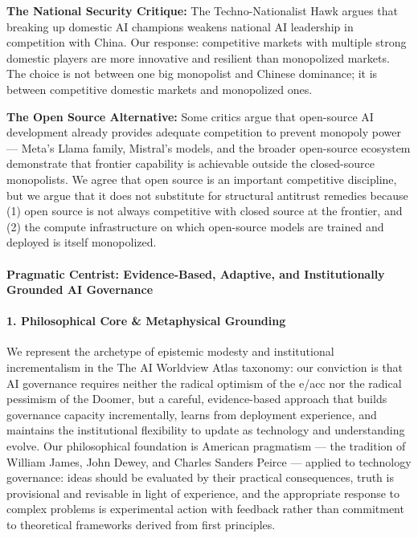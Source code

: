 \textbf{The National Security Critique:} The Techno-Nationalist Hawk
argues that breaking up domestic AI champions weakens national AI
leadership in competition with China. Our response: competitive markets
with multiple strong domestic players are more innovative and resilient
than monopolized markets. The choice is not between one big monopolist
and Chinese dominance; it is between competitive domestic markets and
monopolized ones.

\textbf{The Open Source Alternative:} Some critics argue that
open-source AI development already provides adequate competition to
prevent monopoly power --- Meta's Llama family, Mistral's models, and
the broader open-source ecosystem demonstrate that frontier capability
is achievable outside the closed-source monopolists. We agree that open
source is an important competitive discipline, but we argue that it does
not substitute for structural antitrust remedies because (1) open source
is not always competitive with closed source at the frontier, and (2)
the compute infrastructure on which open-source models are trained and
deployed is itself monopolized.

\paragraph{Pragmatic Centrist: Evidence-Based, Adaptive, and
Institutionally Grounded AI
Governance}\label{pragmatic-centrist-evidence-based-adaptive-and-institutionally-grounded-ai-governance}

\paragraph{1. Philosophical Core \& Metaphysical
Grounding}\label{philosophical-core-metaphysical-grounding-29}

We represent the archetype of epistemic modesty and institutional
incrementalism in the The AI Worldview Atlas taxonomy: our conviction is
that AI governance requires neither the radical optimism of the e/acc
nor the radical pessimism of the Doomer, but a careful, evidence-based
approach that builds governance capacity incrementally, learns from
deployment experience, and maintains the institutional flexibility to
update as technology and understanding evolve. Our philosophical
foundation is American pragmatism --- the tradition of William James,
John Dewey, and Charles Sanders Peirce --- applied to technology
governance: ideas should be evaluated by their practical consequences,
truth is provisional and revisable in light of experience, and the
appropriate response to complex problems is experimental action with
feedback rather than commitment to theoretical frameworks derived from
first principles.

